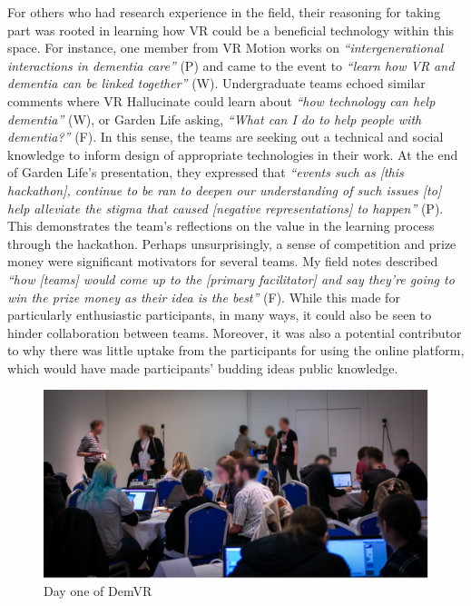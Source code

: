 For others who had research experience in the field, their reasoning for taking part was rooted in learning how VR could be a beneficial technology within this space. For instance, one member from VR Motion works on \textit{``intergenerational interactions in dementia care''} (P) and came to the event to \textit{``learn how VR and dementia can be linked together''} (W). Undergraduate teams echoed similar comments where VR Hallucinate could learn about \textit{``how technology can help dementia''} (W), or Garden Life asking, \textit{``What can I do to help people with dementia?''} (F). In this sense, the teams are seeking out a technical and social knowledge to inform design of appropriate technologies in their work. At the end of Garden Life’s presentation, they expressed that \textit{``events such as [this hackathon], continue to be ran to deepen our understanding of such issues [to] help alleviate the stigma that caused [negative representations] to happen''} (P). This demonstrates the team’s reflections on the value in the learning process through the hackathon. Perhaps unsurprisingly, a sense of competition and prize money were significant motivators for several teams. My field notes described \textit{``how [teams] would come up to the [primary facilitator] and say they’re going to win the prize money as their idea is the best''} (F). While this made for particularly enthusiastic participants, in many ways, it could also be seen to hinder collaboration between teams. Moreover, it was also a potential contributor to why there was little uptake from the participants for using the online platform, which would have made participants’ budding ideas public knowledge.

\begin{figure}[htp]
\centering
\includegraphics[width=.8\linewidth]{Images/DemVR/Findings/DayOneDemVR.png}
\caption{Day one of DemVR}
\label{fig:DayOne}
\end{figure}

